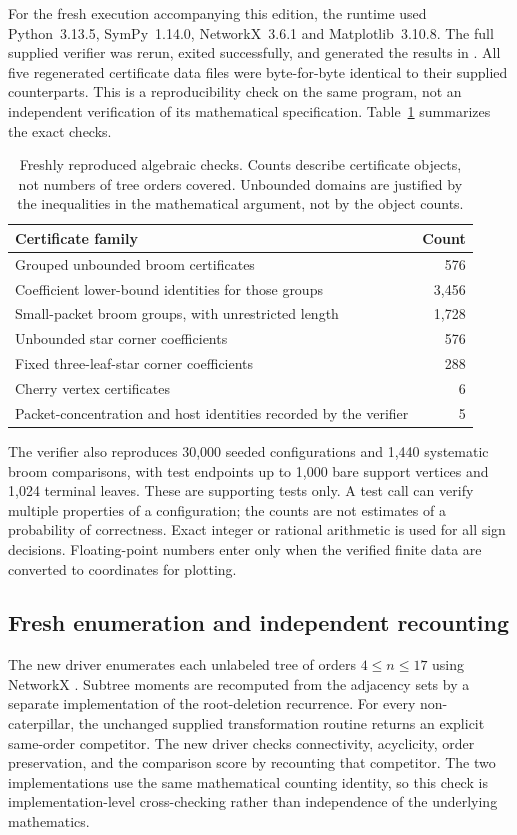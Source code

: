 \documentclass[11pt,reqno]{amsart}
\theoremstyle{plain}
\begin{document}
For the fresh execution accompanying this edition, the runtime used
Python~3.13.5, SymPy~1.14.0, NetworkX~3.6.1 and Matplotlib~3.10.8. The full supplied
verifier was rerun, exited successfully, and generated the results in
. All five regenerated certificate data files were
byte-for-byte identical to their supplied counterparts. This is a reproducibility
check on the same program, not an independent verification of its mathematical
specification. Table~\ref{tab:certificates} summarizes the exact checks.

\begin{table}[tbp]
\caption{Freshly reproduced algebraic checks. Counts describe certificate objects,
not numbers of tree orders covered. Unbounded domains are justified by the
inequalities in the mathematical argument, not by the object counts.}
\label{tab:certificates}
\centering\small
\begin{tabular}{@{}lr@{}}
\toprule
Certificate family & Count \\
\midrule
Grouped unbounded broom certificates & 576 \\
Coefficient lower-bound identities for those groups & 3,456 \\
Small-packet broom groups, with unrestricted length & 1,728 \\
Unbounded star corner coefficients & 576 \\
Fixed three-leaf-star corner coefficients & 288 \\
Cherry vertex certificates & 6 \\
Packet-concentration and host identities recorded by the verifier & 5 \\
\bottomrule
\end{tabular}
\end{table}

The verifier also reproduces 30,000 seeded configurations and 1,440 systematic
broom comparisons, with test endpoints up to 1,000 bare support vertices and
1,024 terminal leaves. These are supporting tests only. A test call can verify
multiple properties of a configuration; the counts are not estimates of a
probability of correctness. Exact integer or rational arithmetic is used for
all sign decisions. Floating-point numbers enter only when the verified finite
data are converted to coordinates for plotting.

\subsection{Fresh enumeration and independent recounting}
The new driver  enumerates each unlabeled
tree of orders $4\le n\le17$ using NetworkX \cite{HagbergSchultSwart2008}.
Subtree moments are recomputed from the adjacency sets by a separate
implementation of the root-deletion recurrence. For every non-caterpillar, the
unchanged supplied transformation routine returns an explicit same-order
competitor. The new driver checks connectivity, acyclicity, order preservation,
and the comparison score by recounting that competitor. The two implementations
use the same mathematical counting identity, so this check is implementation-level
cross-checking rather than independence of the underlying mathematics.
\end{document}
